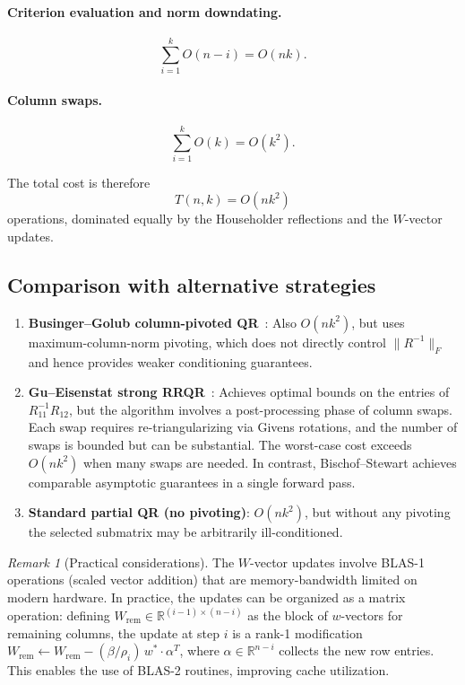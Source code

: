 \documentclass[11pt]{article}
\theoremstyle{definition}
\theoremstyle{remark}
\newtheorem{remark}[theorem]{Remark}
\newcommand{\R}{\mathbb{R}}
\newcommand{\fnorm}[1]{\lVert #1 \rVert_F}
\begin{document}
\paragraph{Criterion evaluation and norm downdating.}
\[
  \sum_{i=1}^{k} O(n - i) = O(nk).
\]

\paragraph{Column swaps.}
\[
  \sum_{i=1}^{k} O(k) = O(k^2).
\]

The total cost is therefore
\begin{equation}\label{eq:total-cost}
  \boxed{T(n, k) = O(nk^2)}
\end{equation}
operations, dominated equally by the Householder reflections and the
$W$-vector updates.

\subsection{Comparison with alternative strategies}

\begin{enumerate}
\item \textbf{Businger--Golub column-pivoted
  QR}~\cite{businger_linear_least_squares}: Also $O(nk^2)$, but uses
  maximum-column-norm pivoting, which does not directly control
  $\fnorm{R^{-1}}$ and hence provides weaker conditioning guarantees.

\item \textbf{Gu--Eisenstat strong RRQR}~\cite{gu_srrqr}: Achieves
  optimal bounds on the entries of $R_{11}^{-1}R_{12}$, but the
  algorithm involves a post-processing phase of column swaps.  Each
  swap requires re-triangularizing via Givens rotations, and the
  number of swaps is bounded but can be substantial.  The worst-case
  cost exceeds $O(nk^2)$ when many swaps are needed.  In contrast,
  Bischof--Stewart achieves comparable asymptotic guarantees in a
  single forward pass.

\item \textbf{Standard partial QR (no pivoting)}: $O(nk^2)$, but
  without any pivoting the selected submatrix may be arbitrarily
  ill-conditioned.
\end{enumerate}

\begin{remark}[Practical considerations]\label{rem:practical}
The $W$-vector updates involve BLAS-1 operations (scaled vector
addition) that are memory-bandwidth limited on modern hardware.  In
practice, the updates can be organized as a matrix operation: defining
$W_{\mathrm{rem}} \in \R^{(i-1) \times (n-i)}$ as the block of
$w$-vectors for remaining columns, the update at step $i$ is a rank-1
modification $W_{\mathrm{rem}} \leftarrow W_{\mathrm{rem}} -
(\beta/\rho_i)\,w^* \cdot \alpha^T$, where $\alpha \in \R^{n-i}$
collects the new row entries.  This enables the use of BLAS-2
routines, improving cache utilization.
\end{remark}
\end{document}
